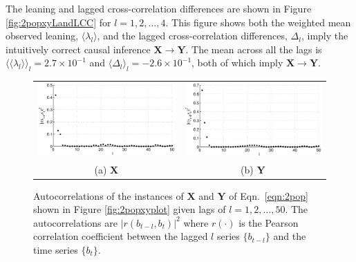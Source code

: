 \documentclass{article}[10pt]
\begin{document}
The leaning and lagged cross-correlation differences are shown in Figure \ref{fig:2popxyLandLCC} for $l=1,2,\ldots,4$.  This figure shows both the weighted mean observed leaning, $\langle \lambda_l\rangle$, and the lagged cross-correlation differences, $\Delta_l$, imply the intuitively correct causal inference $\mathbf{X}\rightarrow\mathbf{Y}$.  The mean across all the lags is $\langle\langle\lambda_l\rangle\rangle_l=2.7\times 10^{-1}$ and $\langle\Delta_l\rangle_l=-2.6\times 10^{-1}$, both of which imply $\mathbf{X}\rightarrow\mathbf{Y}$.  
\begin{figure}[ht]
\begin{tabular}{cc}
\includegraphics[scale=0.48]{CoupLogMapExample_autocorrX.eps} & \includegraphics[scale=0.48]{CoupLogMapExample_autocorrY.eps} \\
(a) $\mathbf{X}$ & (b) $\mathbf{Y}$
\end{tabular}
\caption{Autocorrelations of the instances of $\mathbf{X}$ and $\mathbf{Y}$ of Eqn.\ \ref{eqn:2pop} shown in Figure \ref{fig:2popxyplot} given lags of $l=1,2,\ldots,50$.  The autocorrelations are $|r(b_{t-l},b_t)|^2$ where $r(\cdot)$ is the Pearson correlation coefficient between the lagged $l$ series $\{b_{t-l}\}$ and the time series $\{b_{t}\}$.}
\label{fig:2popxyautocorr}
\end{figure}
\end{document}
